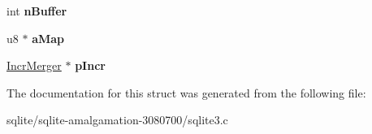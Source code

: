 \begin{DoxyCompactItemize}
\item 
\hypertarget{struct_pma_reader_a422d021b0509c7e5eb2938bba36a5cdd}{int {\bfseries n\+Buffer}}\label{struct_pma_reader_a422d021b0509c7e5eb2938bba36a5cdd}

\item 
\hypertarget{struct_pma_reader_ad90dc0ec0c900dd21377c146ac73c73f}{u8 $\ast$ {\bfseries a\+Map}}\label{struct_pma_reader_ad90dc0ec0c900dd21377c146ac73c73f}

\item 
\hypertarget{struct_pma_reader_a34569bea49de8122239eb40eaae8b10f}{\hyperlink{struct_incr_merger}{Incr\+Merger} $\ast$ {\bfseries p\+Incr}}\label{struct_pma_reader_a34569bea49de8122239eb40eaae8b10f}

\end{DoxyCompactItemize}


The documentation for this struct was generated from the following file\+:\begin{DoxyCompactItemize}
\item 
sqlite/sqlite-\/amalgamation-\/3080700/sqlite3.\+c\end{DoxyCompactItemize}
